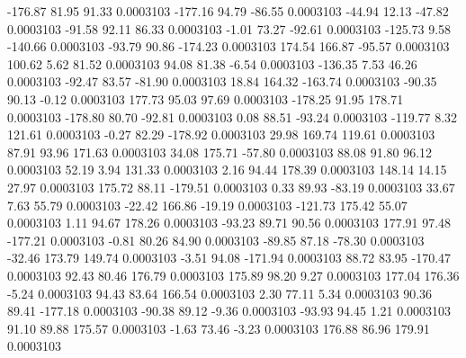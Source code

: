      -176.87       81.95       91.33     0.0003103
     -177.16       94.79      -86.55     0.0003103
      -44.94       12.13      -47.82     0.0003103
      -91.58       92.11       86.33     0.0003103
       -1.01       73.27      -92.61     0.0003103
     -125.73        9.58     -140.66     0.0003103
      -93.79       90.86     -174.23     0.0003103
      174.54      166.87      -95.57     0.0003103
      100.62        5.62       81.52     0.0003103
       94.08       81.38       -6.54     0.0003103
     -136.35        7.53       46.26     0.0003103
      -92.47       83.57      -81.90     0.0003103
       18.84      164.32     -163.74     0.0003103
      -90.35       90.13       -0.12     0.0003103
      177.73       95.03       97.69     0.0003103
     -178.25       91.95      178.71     0.0003103
     -178.80       80.70      -92.81     0.0003103
        0.08       88.51      -93.24     0.0003103
     -119.77        8.32      121.61     0.0003103
       -0.27       82.29     -178.92     0.0003103
       29.98      169.74      119.61     0.0003103
       87.91       93.96      171.63     0.0003103
       34.08      175.71      -57.80     0.0003103
       88.08       91.80       96.12     0.0003103
       52.19        3.94      131.33     0.0003103
        2.16       94.44      178.39     0.0003103
      148.14       14.15       27.97     0.0003103
      175.72       88.11     -179.51     0.0003103
        0.33       89.93      -83.19     0.0003103
       33.67        7.63       55.79     0.0003103
      -22.42      166.86      -19.19     0.0003103
     -121.73      175.42       55.07     0.0003103
        1.11       94.67      178.26     0.0003103
      -93.23       89.71       90.56     0.0003103
      177.91       97.48     -177.21     0.0003103
       -0.81       80.26       84.90     0.0003103
      -89.85       87.18      -78.30     0.0003103
      -32.46      173.79      149.74     0.0003103
       -3.51       94.08     -171.94     0.0003103
       88.72       83.95     -170.47     0.0003103
       92.43       80.46      176.79     0.0003103
      175.89       98.20        9.27     0.0003103
      177.04      176.36       -5.24     0.0003103
       94.43       83.64      166.54     0.0003103
        2.30       77.11        5.34     0.0003103
       90.36       89.41     -177.18     0.0003103
      -90.38       89.12       -9.36     0.0003103
      -93.93       94.45        1.21     0.0003103
       91.10       89.88      175.57     0.0003103
       -1.63       73.46       -3.23     0.0003103
      176.88       86.96      179.91     0.0003103
